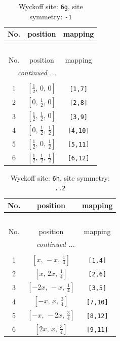 \documentclass[fleqn,8pt]{jsarticle}
\begin{document}
\renewcommand{\arraystretch}{1.2}
\begin{longtable}{ccc}
\caption{Wyckoff site: {\tt 6g}, site symmetry: {\tt -1}}
 \\
 \hline \hline
No. & position & mapping \\ \hline \endfirsthead

\multicolumn{2}{l}{\tablename\ \thetable{}} \\
 \hline \hline
No. & position & mapping \\ \hline \endhead

 \hline \hline
\multicolumn{2}{r}{\footnotesize\it continued ...} \\ \endfoot

 \hline \hline
\multicolumn{2}{r}{} \\ \endlastfoot

1 & $\left[ \frac{1}{2},\, 0,\, 0 \right]$ & {\tt [1,7]} \\ \hline
2 & $\left[ 0,\, \frac{1}{2},\, 0 \right]$ & {\tt [2,8]} \\ \hline
3 & $\left[ \frac{1}{2},\, \frac{1}{2},\, 0 \right]$ & {\tt [3,9]} \\ \hline
4 & $\left[ 0,\, \frac{1}{2},\, \frac{1}{2} \right]$ & {\tt [4,10]} \\ \hline
5 & $\left[ \frac{1}{2},\, 0,\, \frac{1}{2} \right]$ & {\tt [5,11]} \\ \hline
6 & $\left[ \frac{1}{2},\, \frac{1}{2},\, \frac{1}{2} \right]$ & {\tt [6,12]} \\
\end{longtable}
\renewcommand{\arraystretch}{1.2}
\begin{longtable}{ccc}
\caption{Wyckoff site: {\tt 6h}, site symmetry: {\tt ..2}}
 \\
 \hline \hline
No. & position & mapping \\ \hline \endfirsthead

\multicolumn{2}{l}{\tablename\ \thetable{}} \\
 \hline \hline
No. & position & mapping \\ \hline \endhead

 \hline \hline
\multicolumn{2}{r}{\footnotesize\it continued ...} \\ \endfoot

 \hline \hline
\multicolumn{2}{r}{} \\ \endlastfoot

1 & $\left[ x,\, - x,\, \frac{1}{4} \right]$ & {\tt [1,4]} \\ \hline
2 & $\left[ x,\, 2 x,\, \frac{1}{4} \right]$ & {\tt [2,6]} \\ \hline
3 & $\left[ - 2 x,\, - x,\, \frac{1}{4} \right]$ & {\tt [3,5]} \\ \hline
4 & $\left[ - x,\, x,\, \frac{3}{4} \right]$ & {\tt [7,10]} \\ \hline
5 & $\left[ - x,\, - 2 x,\, \frac{3}{4} \right]$ & {\tt [8,12]} \\ \hline
6 & $\left[ 2 x,\, x,\, \frac{3}{4} \right]$ & {\tt [9,11]} \\
\end{longtable}
\end{document}

